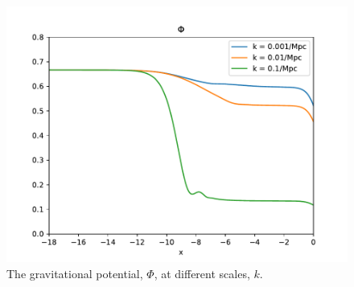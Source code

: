 \documentclass{aa}
\begin{document}
\begin{figure}[h!]
   \includegraphics[scale=0.6]{../figures/milestone3/test_phi.pdf}
   \caption{The gravitational potential, $\Phi$, at different scales, $k$.}\label{fig:test5}
\end{figure}
\end{document}
